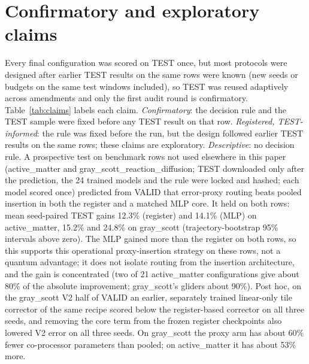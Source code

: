 \documentclass{article}
\begin{document}
\section{Confirmatory and exploratory claims}
\label{app:claims}

Every final configuration was scored on TEST once, but most protocols were designed after earlier TEST results on the
same rows were known (new seeds or budgets on the same test windows included), so TEST was reused adaptively across
amendments and only the first audit round is confirmatory. Table~\ref{tab:claims} labels each claim.
\emph{Confirmatory}: the decision rule and the TEST sample were fixed before any TEST result on that row.
\emph{Registered, TEST-informed}: the rule was fixed before the run, but the design followed earlier TEST results on
the same rows; these claims are exploratory. \emph{Descriptive}: no decision rule. A prospective test on benchmark rows
not used elsewhere in this paper (active\_matter and gray\_scott\_reaction\_diffusion; TEST downloaded only after the
prediction, the 24 trained models and the rule were locked and hashed; each model scored once) predicted from VALID that
error-proxy routing beats pooled insertion in both the register and a matched MLP core. It held on both rows: mean
seed-paired TEST gains 12.3\% (register) and 14.1\% (MLP) on active\_matter, 15.2\% and 24.8\% on gray\_scott
(trajectory-bootstrap 95\% intervals above zero). The MLP gained more than the register on both rows, so this supports this
operational proxy-insertion strategy on these rows, not a quantum advantage; it does not isolate routing from the
insertion architecture, and the gain is concentrated (two of 21 active\_matter configurations give about 80\% of the
absolute improvement; gray\_scott's gliders about 90\%). Post hoc, on the gray\_scott V2 half of VALID an earlier, separately trained linear-only tile
corrector of the same recipe scored below the register-based corrector on all three seeds, and removing the core term
from the frozen register checkpoints also lowered V2 error on all three seeds. On gray\_scott the proxy arm has about 60\% fewer co-processor
parameters than pooled; on active\_matter it has about 53\% more.
\end{document}
